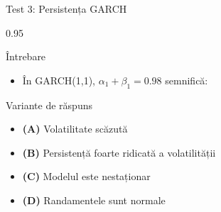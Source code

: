 \documentclass[9pt, aspectratio=169, t]{beamer}
\begin{document}
\begin{frame}{Test 3: Persistența GARCH}
    \begin{cminipage}{0.95\textwidth}
    \begin{alertblock}{Întrebare}
        \begin{itemize}\setlength{\itemsep}{0pt}
            \item În GARCH(1,1), $\alpha_1 + \beta_1 = 0.98$ semnifică:
        \end{itemize}
    \end{alertblock}

    \begin{block}{Variante de răspuns}
    \begin{itemize}\setlength{\itemsep}{0pt}
        \item \textcolor{MainBlue}{\textbf{(A)}} Volatilitate scăzută
        \item \textcolor{MainBlue}{\textbf{(B)}} Persistență foarte ridicată a volatilității
        \item \textcolor{MainBlue}{\textbf{(C)}} Modelul este nestaționar
        \item \textcolor{MainBlue}{\textbf{(D)}} Randamentele sunt normale
    \end{itemize}
    \end{block}
    \end{cminipage}
\end{frame}
\end{document}
